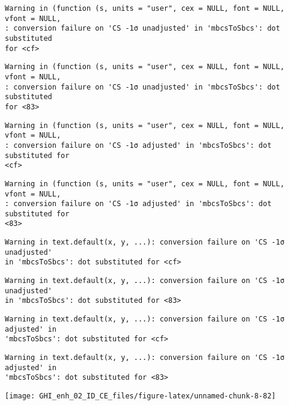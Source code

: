 \documentclass[
  10pt,
  a4paper,oneside]{article}
\begin{document}
\begin{verbatim}
Warning in (function (s, units = "user", cex = NULL, font = NULL, vfont = NULL,
: conversion failure on 'CS -1σ unadjusted' in 'mbcsToSbcs': dot substituted
for <cf>
\end{verbatim}

\begin{verbatim}
Warning in (function (s, units = "user", cex = NULL, font = NULL, vfont = NULL,
: conversion failure on 'CS -1σ unadjusted' in 'mbcsToSbcs': dot substituted
for <83>
\end{verbatim}

\begin{verbatim}
Warning in (function (s, units = "user", cex = NULL, font = NULL, vfont = NULL,
: conversion failure on 'CS -1σ adjusted' in 'mbcsToSbcs': dot substituted for
<cf>
\end{verbatim}

\begin{verbatim}
Warning in (function (s, units = "user", cex = NULL, font = NULL, vfont = NULL,
: conversion failure on 'CS -1σ adjusted' in 'mbcsToSbcs': dot substituted for
<83>
\end{verbatim}

\begin{verbatim}
Warning in text.default(x, y, ...): conversion failure on 'CS -1σ unadjusted'
in 'mbcsToSbcs': dot substituted for <cf>
\end{verbatim}

\begin{verbatim}
Warning in text.default(x, y, ...): conversion failure on 'CS -1σ unadjusted'
in 'mbcsToSbcs': dot substituted for <83>
\end{verbatim}

\begin{verbatim}
Warning in text.default(x, y, ...): conversion failure on 'CS -1σ adjusted' in
'mbcsToSbcs': dot substituted for <cf>
\end{verbatim}

\begin{verbatim}
Warning in text.default(x, y, ...): conversion failure on 'CS -1σ adjusted' in
'mbcsToSbcs': dot substituted for <83>
\end{verbatim}

\begin{center}\texttt{[image: GHI\_enh\_02\_ID\_CE\_files/figure-latex/unnamed-chunk-8-82]} \end{center}
\end{document}
